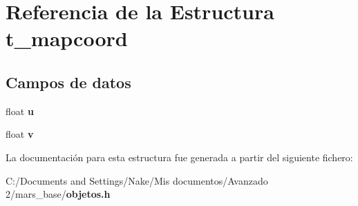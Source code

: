 \section{Referencia de la Estructura t\_\-mapcoord}
\label{structt__mapcoord}
\subsection*{Campos de datos}
\begin{DoxyCompactItemize}
\item 
float {\bfseries u}\label{structt__mapcoord_a55831f7eab5ed2917a0191e858852f42}

\item 
float {\bfseries v}\label{structt__mapcoord_a48d9522e58fa05906c6dba23e5745a72}

\end{DoxyCompactItemize}


La documentación para esta estructura fue generada a partir del siguiente fichero:\begin{DoxyCompactItemize}
\item 
C:/Documents and Settings/Nake/Mis documentos/Avanzado 2/mars\_\-base/{\bf objetos.h}\end{DoxyCompactItemize}
